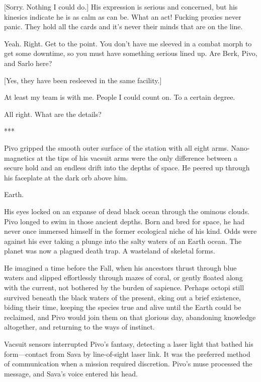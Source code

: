 [Sorry. Nothing I could do.] His expression is serious and concerned,
but his kinesics indicate he is as calm as can be. What an act!
Fucking proxies never panic. They hold all the cards and it's never
their minds that are on the line.

Yeah. Right. Get to the point. You don't have me sleeved in a combat
morph to get some downtime, so you must have something serious lined
up. Are Berk, Pivo, and Sarlo here?

[Yes, they have been resleeved in the same facility.]

At least my team is with me. People I could count on. To a certain
degree.

All right. What are the details?

\begin{center}
  ***
\end{center}

Pivo gripped the smooth outer surface of the station with all eight
arms. Nano-magnetics at the tips of his vacsuit arms were the only
difference between a secure hold and an endless drift into the depths
of space. He peered up through his faceplate at the dark orb above
him.

Earth.

His eyes locked on an expanse of dead black ocean through the ominous
clouds. Pivo longed to swim in those ancient depths. Born and bred for
space, he had never once immersed himself in the former ecological
niche of his kind. Odds were against his ever taking a plunge into the
salty waters of an Earth ocean. The planet was now a plagued death
trap. A wasteland of skeletal forms.

He imagined a time before the Fall, when his ancestors thrust through
blue waters and slipped effortlessly through mazes of coral, or gently
floated along with the current, not bothered by the burden of
sapience.  Perhaps octopi still survived beneath the black waters of
the present, eking out a brief existence, biding their time, keeping
the species true and alive until the Earth could be reclaimed, and
Pivo would join them on that glorious day, abandoning knowledge
altogether, and returning to the ways of instinct.

Vacsuit sensors interrupted Pivo's fantasy, detecting a laser light
that bathed his form—contact from Sava by line-of-sight laser link. It
was the preferred method of communication when a mission required
discretion. Pivo's muse processed the message, and Sava's voice
entered his head.

